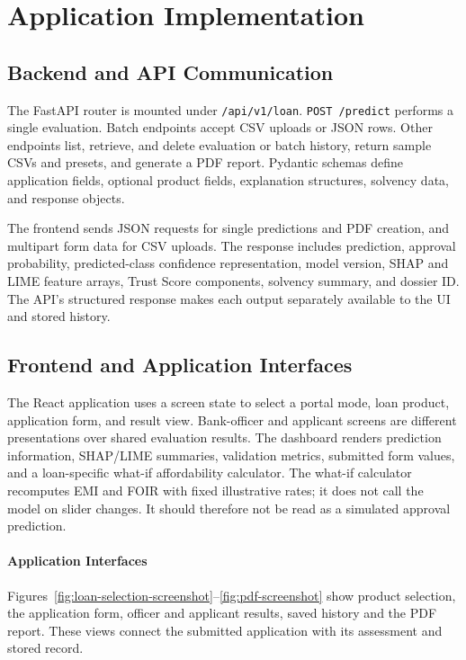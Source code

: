 \section{Application Implementation}
\subsection{Backend and API Communication}
The FastAPI router is mounted under \texttt{/api/v1/loan}. \texttt{POST /predict} performs a single evaluation. Batch endpoints accept CSV uploads or JSON rows. Other endpoints list, retrieve, and delete evaluation or batch history, return sample CSVs and presets, and generate a PDF report. Pydantic schemas define application fields, optional product fields, explanation structures, solvency data, and response objects.

The frontend sends JSON requests for single predictions and PDF creation, and multipart form data for CSV uploads. The response includes prediction, approval probability, predicted-class confidence representation, model version, SHAP and LIME feature arrays, Trust Score components, solvency summary, and dossier ID. The API's structured response makes each output separately available to the UI and stored history.

\subsection{Frontend and Application Interfaces}
The React application uses a screen state to select a portal mode, loan product, application form, and result view. Bank-officer and applicant screens are different presentations over shared evaluation results. The dashboard renders prediction information, SHAP/LIME summaries, validation metrics, submitted form values, and a loan-specific what-if affordability calculator. The what-if calculator recomputes EMI and FOIR with fixed illustrative rates; it does not call the model on slider changes. It should therefore not be read as a simulated approval prediction.

\paragraph*{Application Interfaces}
Figures~\ref{fig:loan-selection-screenshot}--\ref{fig:pdf-screenshot} show product selection, the application form, officer and applicant results, saved history and the PDF report. These views connect the submitted application with its assessment and stored record.

